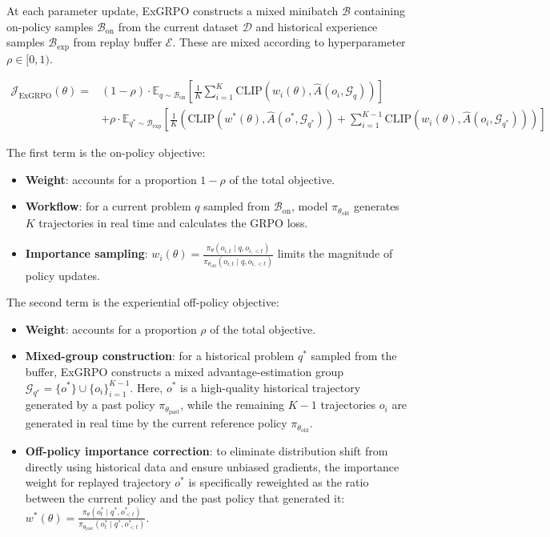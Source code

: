 At each parameter update, ExGRPO constructs a mixed minibatch \(\mathcal{B}\) containing on-policy samples \(\mathcal{B}_{\mathrm{on}}\) from the current dataset \(\mathcal{D}\) and historical experience samples \(\mathcal{B}_{\mathrm{exp}}\) from replay buffer \(\mathcal{E}\). These are mixed according to hyperparameter \(\rho\in[0,1)\).

\[
\begin{aligned}
\mathcal{J}_{\mathrm{ExGRPO}}(\theta)
=&(1-\rho)\cdot
\mathbb{E}_{q\sim\mathcal{B}_{\mathrm{on}}}
\left[
\frac{1}{K}\sum_{i=1}^{K}
\mathrm{CLIP}\left(w_i(\theta),\hat{A}(o_i,\mathcal{G}_q)\right)
\right] \\
&+\rho\cdot
\mathbb{E}_{q^{\ast}\sim\mathcal{B}_{\mathrm{exp}}}
\left[
\frac{1}{K}
\left(
\mathrm{CLIP}\left(w^{\ast}(\theta),\hat{A}(o^{\ast},\mathcal{G}_{q^{\ast}})\right)
+\sum_{i=1}^{K-1}
\mathrm{CLIP}\left(w_i(\theta),\hat{A}(o_i,\mathcal{G}_{q^{\ast}})\right)
\right)
\right]
\end{aligned}
\]

The first term is the on-policy objective:

\begin{itemize}
\tightlist
\item
  \textbf{Weight}: accounts for a proportion \(1-\rho\) of the total objective.
\item
  \textbf{Workflow}: for a current problem \(q\) sampled from \(\mathcal{B}_{\mathrm{on}}\), model \(\pi_{\theta_{\mathrm{old}}}\) generates \(K\) trajectories in real time and calculates the GRPO loss.
\item
  \textbf{Importance sampling}: \(w_i(\theta)=\frac{\pi_\theta(o_{i,t}\mid q,o_{i,\lt t})}{\pi_{\theta_{\mathrm{old}}}(o_{i,t}\mid q,o_{i,\lt t})}\) limits the magnitude of policy updates.
\end{itemize}

The second term is the experiential off-policy objective:

\begin{itemize}
\tightlist
\item
  \textbf{Weight}: accounts for a proportion \(\rho\) of the total objective.
\item
  \textbf{Mixed-group construction}: for a historical problem \(q^{\ast}\) sampled from the buffer, ExGRPO constructs a mixed advantage-estimation group \(\mathcal{G}_{q^{\ast}}=\{o^{\ast}\}\cup\{o_i\}_{i=1}^{K-1}\). Here, \(o^{\ast}\) is a high-quality historical trajectory generated by a past policy \(\pi_{\theta_{\mathrm{past}}}\), while the remaining \(K-1\) trajectories \(o_i\) are generated in real time by the current reference policy \(\pi_{\theta_{\mathrm{old}}}\).
\item
  \textbf{Off-policy importance correction}: to eliminate distribution shift from directly using historical data and ensure unbiased gradients, the importance weight for replayed trajectory \(o^{\ast}\) is specifically reweighted as the ratio between the current policy and the past policy that generated it: \(w^{\ast}(\theta)=\frac{\pi_\theta(o_t^{\ast}\mid q^{\ast},o_{\lt t}^{\ast})}{\pi_{\theta_{\mathrm{past}}}(o_t^{\ast}\mid q^{\ast},o_{\lt t}^{\ast})}\).
\end{itemize}


